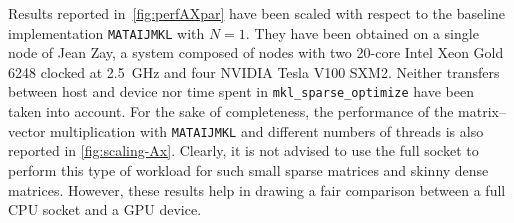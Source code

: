 \documentclass[3p,11pt]{elsarticle}
\newcommand{\pk}[1]{\texttt{#1}}
\begin{document}
Results reported in~\cref{fig:perfAXpar} have been scaled with respect to the
baseline implementation \pk{MATAIJMKL} with $N=1$. They have been obtained on a
single node of {Jean Zay}, a system composed of  nodes with two 20-core Intel Xeon Gold 6248 clocked at
\SI{2.5}{\giga\hertz} and four NVIDIA Tesla V100 SXM2. Neither transfers
between host and device nor time spent in \texttt{mkl\_sparse\_optimize} have
been taken into account. 
For the sake of completeness, the performance of
the matrix--vector multiplication with \pk{MATAIJMKL} and different numbers of threads is also reported in
\cref{fig:scaling-Ax}. Clearly, it is not advised to use the full socket to
perform this type of workload for such small sparse matrices and skinny dense
matrices. However, these results help in drawing a fair comparison between a full CPU socket
and a GPU device.
\end{document}
